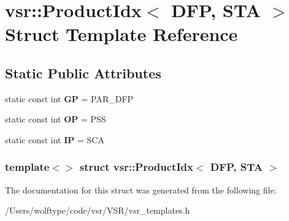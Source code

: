 \hypertarget{structvsr_1_1_product_idx_3_01_d_f_p_00_01_s_t_a_01_4}{\section{vsr\-:\-:Product\-Idx$<$ D\-F\-P, S\-T\-A $>$ Struct Template Reference}
\label{structvsr_1_1_product_idx_3_01_d_f_p_00_01_s_t_a_01_4}
}
\subsection*{Static Public Attributes}
\begin{DoxyCompactItemize}
\item 
\hypertarget{structvsr_1_1_product_idx_3_01_d_f_p_00_01_s_t_a_01_4_a402da6c18083bc36a7bfc407fba4fe80}{static const int {\bfseries G\-P} = P\-A\-R\-\_\-\-D\-F\-P}\label{structvsr_1_1_product_idx_3_01_d_f_p_00_01_s_t_a_01_4_a402da6c18083bc36a7bfc407fba4fe80}

\item 
\hypertarget{structvsr_1_1_product_idx_3_01_d_f_p_00_01_s_t_a_01_4_ad8d4237eee9ce12dbb3a64677354ced9}{static const int {\bfseries O\-P} = P\-S\-S}\label{structvsr_1_1_product_idx_3_01_d_f_p_00_01_s_t_a_01_4_ad8d4237eee9ce12dbb3a64677354ced9}

\item 
\hypertarget{structvsr_1_1_product_idx_3_01_d_f_p_00_01_s_t_a_01_4_abe47f3e5de4d43a92c25432a1e5a81f8}{static const int {\bfseries I\-P} = S\-C\-A}\label{structvsr_1_1_product_idx_3_01_d_f_p_00_01_s_t_a_01_4_abe47f3e5de4d43a92c25432a1e5a81f8}

\end{DoxyCompactItemize}
\subsubsection*{template$<$$>$ struct vsr\-::\-Product\-Idx$<$ D\-F\-P, S\-T\-A $>$}



The documentation for this struct was generated from the following file\-:\begin{DoxyCompactItemize}
\item 
/\-Users/wolftype/code/vsr/\-V\-S\-R/vsr\-\_\-templates.\-h\end{DoxyCompactItemize}
